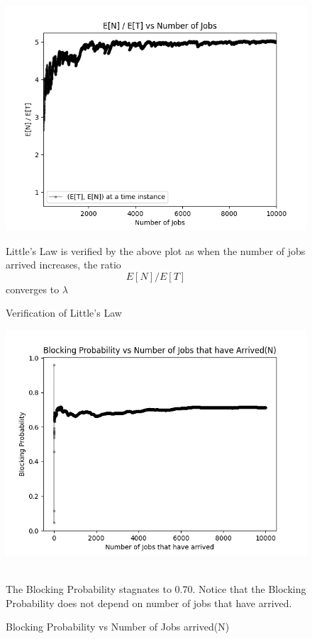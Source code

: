 \documentclass[10pt]{article}
\begin{document}
\begin{figure}
    \centering
    \includegraphics{images/littles_law_verification.png}
    \caption{Verification of Little's Law}
    \label{E[N]/E[T] vs N}
Little's Law is verified by the above plot as when the number of jobs arrived increases, the ratio 
$$ E[N]/E[T]$$
converges to $\lambda$ \\
\end{figure}
\begin{figure}
    \centering
    \includegraphics{images/blocking_probability.png}
    \caption{Blocking Probability vs Number of Jobs arrived(N)}
    \label{Blocking Probability vs N}
\\
The Blocking Probability stagnates to 0.70. Notice that the Blocking Probability does not depend on number of jobs that have arrived.
\end{figure}
\end{document}
